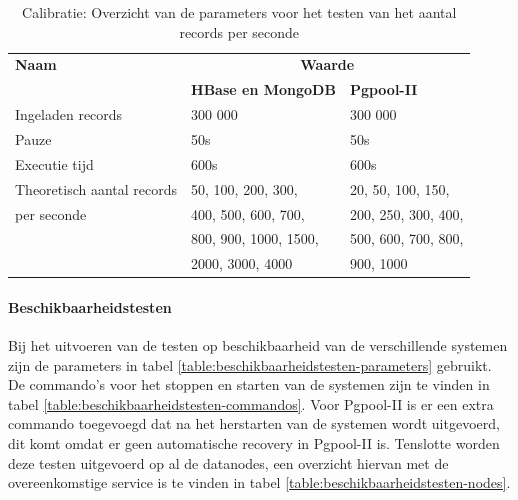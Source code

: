 \begin{table}[h!]
	\centering
	\begin{tabular}{l| l l }
		\textbf{Naam} & \multicolumn{2}{c}{\textbf{Waarde}}  \\
		
		& \textbf{HBase en MongoDB} & \textbf{Pgpool-II} \\
		\hline
		Ingeladen records  & 300 000 & 300 000 \\
		Pauze & 50s & 50s \\
		Executie tijd & 600s & 600s\\
		Theoretisch aantal records  & 50, 100, 200, 300,   & 20, 50, 100, 150,   \\
		per seconde & 400, 500, 600, 700, & 200, 250, 300, 400,  \\
		& 800, 900, 1000, 1500,  & 500, 600, 700, 800,  \\
		& 2000, 3000, 4000 &  900, 1000 \\
	\end{tabular}
	\caption{Calibratie: Overzicht van de parameters voor het testen van het aantal records per seconde}
	\label{table:calibratiequeriesperseconde}
\end{table}

\paragraph{Beschikbaarheidstesten} Bij het uitvoeren van de testen op beschikbaarheid van de verschillende systemen zijn de parameters in tabel \ref{table:beschikbaarheidstesten-parameters} gebruikt. De commando's voor het stoppen en starten van de systemen zijn te vinden in tabel \ref{table:beschikbaarheidstesten-commandos}.  Voor Pgpool-II is er een extra commando toegevoegd dat na het herstarten van de systemen wordt uitgevoerd, dit komt omdat er geen automatische recovery in Pgpool-II is. Tenslotte worden deze testen uitgevoerd op al de datanodes, een overzicht hiervan met de overeenkomstige service is te vinden in tabel \ref{table:beschikbaarheidstesten-nodes}.

